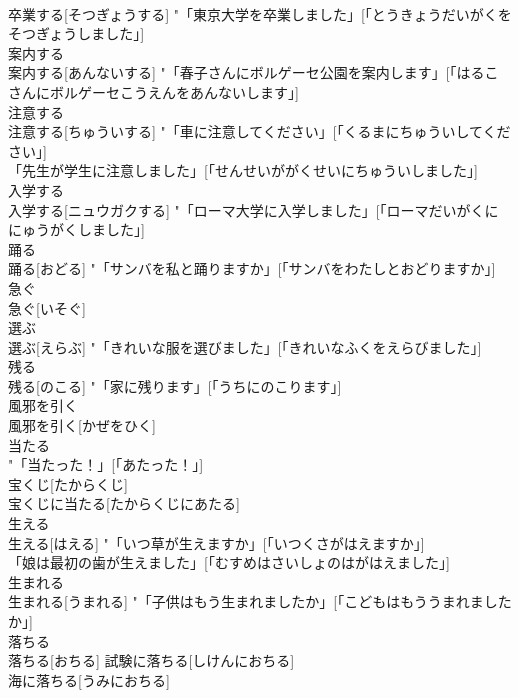 \documentclass[8pt]{extreport}
\begin{document}
\begin{CJK}{UTF8}{min}
\\	[不規則]	卒業する[そつぎょうする]	"「東京大学を卒業しました」[「とうきょうだいがくをそつぎょうしました」] 
\\	案内する	
\\	[不規則]	案内する[あんないする]	"「春子さんにボルゲーセ公園を案内します」[「はるこさんにボルゲーセこうえんをあんないします」] 
\\	注意する	
\\	[不規則]	注意する[ちゅういする]	"「車に注意してください」[「くるまにちゅういしてください」] 
\\	「先生が学生に注意しました」[「せんせいががくせいにちゅういしました」] 
\\	入学する	
\\	[不規則]	入学する[ニュウガクする]	"「ローマ大学に入学しました」[「ローマだいがくににゅうがくしました」] 
\\	踊る	
\\	[五段]	踊る[おどる]	"「サンバを私と踊りますか」[「サンバをわたしとおどりますか」] 
\\	急ぐ	
\\	急ぐ[いそぐ]	
\\	選ぶ	
\\	選ぶ[えらぶ]	"「きれいな服を選びました」[「きれいなふくをえらびました」] 
\\	残る	
\\	残る[のこる]	"「家に残ります」[「うちにのこります」] 
\\	風邪を引く	
\\	風邪を引く[かぜをひく]	
\\	当たる	
\\	[五段, 
\\	当たる[あたる]	"「当たった！」[「あたった！」] 
\\	宝くじ[たからくじ] 
\\	宝くじに当たる[たからくじにあたる] 
\\	生える	
\\	[一段]	生える[はえる]	"「いつ草が生えますか」[「いつくさがはえますか」] 
\\	「娘は最初の歯が生えました」[「むすめはさいしょのはがはえました」] 
\\	生まれる	
\\	[一段]	生まれる[うまれる]	"「子供はもう生まれましたか」[「こどもはもううまれましたか」] 
\\	落ちる	
\\	[一段]	落ちる[おちる]	試験に落ちる[しけんにおちる] 
\\	海に落ちる[うみにおちる] 

\end{CJK}
\end{document}
